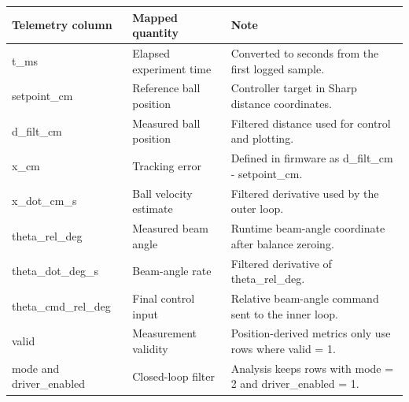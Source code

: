 \small
\begin{tabularx}{\linewidth}{@{}l l X@{}}
\toprule
Telemetry column & Mapped quantity & Note \\
\midrule
t\_ms & Elapsed experiment time & Converted to seconds from the first logged sample. \\
setpoint\_cm & Reference ball position & Controller target in Sharp distance coordinates. \\
d\_filt\_cm & Measured ball position & Filtered distance used for control and plotting. \\
x\_cm & Tracking error & Defined in firmware as d\_filt\_cm - setpoint\_cm. \\
x\_dot\_cm\_s & Ball velocity estimate & Filtered derivative used by the outer loop. \\
theta\_rel\_deg & Measured beam angle & Runtime beam-angle coordinate after balance zeroing. \\
theta\_dot\_deg\_s & Beam-angle rate & Filtered derivative of theta\_rel\_deg. \\
theta\_cmd\_rel\_deg & Final control input & Relative beam-angle command sent to the inner loop. \\
valid & Measurement validity & Position-derived metrics only use rows where valid = 1. \\
mode and driver\_enabled & Closed-loop filter & Analysis keeps rows with mode = 2 and driver\_enabled = 1. \\
\bottomrule
\end{tabularx}
